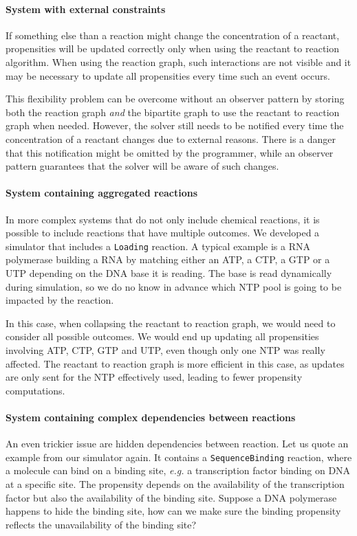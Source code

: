 \paragraph{System with external constraints}
If something else than a reaction might change the concentration of a reactant,
propensities will be updated correctly only when using the reactant to reaction algorithm.
When using the reaction graph, such interactions are not visible and
it may be necessary to update all propensities every time such an event occurs.

This flexibility problem can be overcome without an observer pattern
by storing both the reaction graph \emph{and} the bipartite graph to use the reactant to reaction graph when needed.
However, the solver still needs to be notified every time the concentration of a reactant changes due to external reasons.
There is a danger that this notification might be omitted by the programmer,
while an observer pattern guarantees that the solver will be aware of such changes.

\paragraph{System containing aggregated reactions}
In more complex systems that do not only include chemical reactions,
it is possible to include reactions that have multiple outcomes.
We developed a simulator that includes a \texttt{Loading} reaction.
A typical example is a RNA polymerase building a RNA by matching either
an ATP, a CTP, a GTP or a UTP depending on the DNA base it is reading.
The base is read dynamically during simulation,
so we do no know in advance which NTP pool is going to be impacted by the reaction.

In this case, when collapsing the reactant to reaction graph,
we would need to consider all possible outcomes.
We would end up updating all propensities involving ATP, CTP, GTP and UTP,
even though only one NTP was really affected.
The reactant to reaction graph is more efficient in this case,
as updates are only sent for the NTP effectively used, leading to fewer propensity computations.

\paragraph{System containing complex dependencies between reactions}
An even trickier issue are hidden dependencies between reaction.
Let us quote an example from our simulator again.
It contains a \texttt{SequenceBinding} reaction, where a molecule can bind on a binding site,
\textit{e.g.} a transcription factor binding on DNA at a specific site.
The propensity depends on the availability of the transcription factor but also the availability of the binding site.
Suppose a DNA polymerase happens to hide the binding site,
how can we make sure the binding propensity reflects the unavailability of the binding site?

